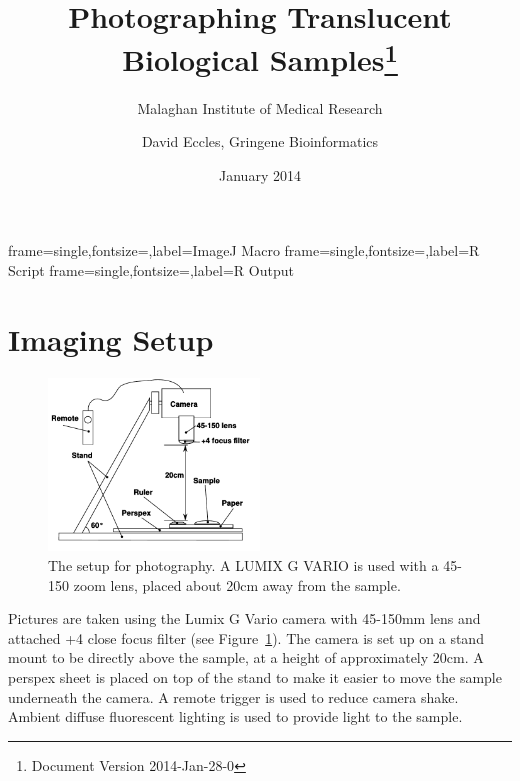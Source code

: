 \documentclass[a4paper]{scrartcl}
\begin{document}
\newcommand{\tabh}[1]{\multicolumn{1}{l}{\bfseries#1}} %


{frame=single,fontsize=\scriptsize,label=ImageJ Macro}
{frame=single,fontsize=\scriptsize,label=R Script}
{frame=single,fontsize=\scriptsize,label=R Output}


\setlength{\parindent}{0.0in}
\setlength{\parskip}{0.1in}


\pagestyle{fancy}
\fancyhead[L]{\thepage}
\fancyhead[R]{\leftmark}

\title{Photographing Translucent Biological Samples\footnote{Document Version 2014-Jan-28-0}}
\subtitle{Malaghan Institute of Medical Research}
\author{David Eccles, Gringene Bioinformatics}
\date{January 2014}
\maketitle


 {}
\tableofcontents{}
\clearpage


\section{Imaging Setup}

\begin{figure}
  \centering
  \includegraphics[width=0.5\textwidth]{illustrations/photography_setup.pdf}
  \caption{The setup for photography. A LUMIX G VARIO is used with a
    45-150 zoom lens, placed about 20cm away from the sample.}
  \label{fig:image-setup}
\end{figure}

Pictures are taken using the Lumix G Vario camera with 45-150mm lens
and attached +4 close focus filter (see
Figure~\ref{fig:image-setup}). The camera is set up on a stand mount
to be directly above the sample, at a height of approximately 20cm. A
perspex sheet is placed on top of the stand to make it easier to move
the sample underneath the camera. A remote trigger is used to reduce
camera shake. Ambient diffuse fluorescent lighting is used to provide
light to the sample.
\end{document}
